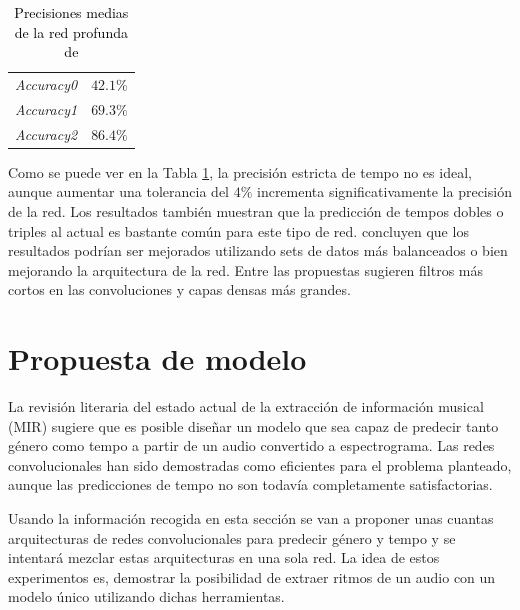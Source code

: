 \begin{table}
\centering
\begin{tabular}{ll}
\hline
\textit{Accuracy0}                   & $42.1\%$           \\
\textit{Accuracy1}                   & $69.3\%$           \\
\textit{Accuracy2}                   & $86.4\%$           \\ \hline
\end{tabular}
\caption{\textcolor{black}{Precisiones medias de la red profunda de \cite{Schreiber:2018}}}
\label{tab:CNN_tempo_shcreiber2018}
\end{table}

Como se puede ver en la Tabla \ref{tab:CNN_tempo_shcreiber2018}, la precisión estricta de tempo no es ideal, aunque aumentar una tolerancia del $4\%$ incrementa significativamente la precisión de la red. Los resultados también muestran que la predicción de tempos dobles o triples al actual es bastante común para este tipo de red. \cite{Schreiber:2018} concluyen que los resultados podrían ser mejorados utilizando sets de datos más balanceados o bien mejorando la arquitectura de la red. Entre las propuestas sugieren filtros más cortos en las convoluciones y capas densas más grandes.


\section{Propuesta de modelo}\label{sec:propuesta}

\noindent La revisión literaria del estado actual de la extracción de información musical (MIR) sugiere que es posible diseñar un modelo que sea capaz de predecir tanto género como tempo a partir de un audio convertido a espectrograma. Las redes convolucionales han sido demostradas como eficientes para el problema planteado, aunque las predicciones de tempo no son todavía completamente satisfactorias. 

Usando la información recogida en esta sección se van a proponer unas cuantas arquitecturas de redes convolucionales para predecir género y tempo y se intentará mezclar estas arquitecturas en una sola red. La idea de estos experimentos es, demostrar la posibilidad de extraer ritmos de un audio con un modelo único utilizando dichas herramientas. 